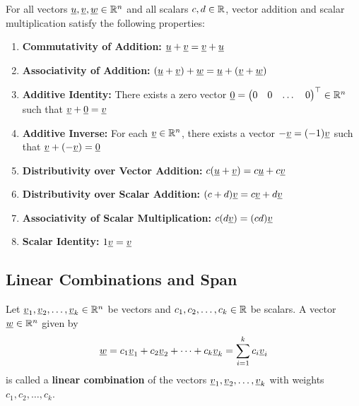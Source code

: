 \begin{theorem}
    For all vectors $\underline{u}, \underline{v}, \underline{w} \in \mathbb{R}^n$ and all scalars $c, d \in \mathbb{R}$, vector addition and scalar multiplication satisfy the following properties:
    \begin{enumerate}[label=\roman*.]
        \item \textbf{Commutativity of Addition:} $\underline{u} + \underline{v} = \underline{v} + \underline{u}$
        \item \textbf{Associativity of Addition:} $(\underline{u} + \underline{v}) + \underline{w} = \underline{u} + (\underline{v} + \underline{w})$
        \item \textbf{Additive Identity:} There exists a zero vector $\underline{0} = \begin{pmatrix} 0 & 0 & \dots & 0 \end{pmatrix}^{\top} \in \mathbb{R}^n$ such that $\underline{v} + \underline{0} = \underline{v}$
        \item \textbf{Additive Inverse:} For each $\underline{v} \in \mathbb{R}^n$, there exists a vector $-\underline{v} = (-1)\underline{v}$ such that $\underline{v} + (-\underline{v}) = \underline{0}$
        \item \textbf{Distributivity over Vector Addition:} $c(\underline{u} + \underline{v}) = c\underline{u} + c\underline{v}$
        \item \textbf{Distributivity over Scalar Addition:} $(c + d)\underline{v} = c\underline{v} + d\underline{v}$
        \item \textbf{Associativity of Scalar Multiplication:} $c(d\underline{v}) = (cd)\underline{v}$
        \item \textbf{Scalar Identity:} $1\underline{v} = \underline{v}$
    \end{enumerate}
\end{theorem}

\subsection{Linear Combinations and Span}

\begin{definition}
    Let $\underline{v}_1, \underline{v}_2, \dots, \underline{v}_k \in \mathbb{R}^n$ be vectors and $c_1, c_2, \dots, c_k \in \mathbb{R}$ be scalars. A vector $\underline{w} \in \mathbb{R}^n$ given by
    \[
        \underline{w} = c_1 \underline{v}_1 + c_2 \underline{v}_2 + \dots + c_k \underline{v}_k = \sum_{i=1}^k c_i \underline{v}_i
    \]
    is called a \textbf{linear combination} of the vectors $\underline{v}_1, \underline{v}_2, \dots, \underline{v}_k$ with weights $c_1, c_2, \dots, c_k$.
\end{definition}

